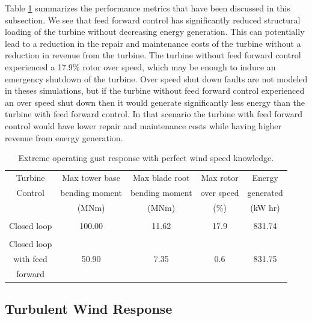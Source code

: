 Table \ref{Table3-1} summarizes the performance metrics that have been discussed in this subsection. We see that feed forward control has significantly reduced structural loading of the turbine without decreasing energy generation. This can potentially lead to a reduction in the repair and maintenance costs of the turbine without a reduction in revenue from the turbine. The turbine without feed forward control experienced a 17.9$\%$ rotor over speed, which may be enough to induce an emergency shutdown of the turbine. Over speed shut down faults are not modeled in theses simulations, but if the turbine without feed forward control experienced an over speed shut down then it would generate significantly less energy than the turbine with feed forward control. In that scenario the turbine with feed forward control would have lower repair and maintenance costs while having higher revenue from energy generation.

\begin{table}
\centering
\begin{tabular}{ c | c c c c }
\hline
\hline
Turbine			& Max tower	base		& Max blade	root		& Max rotor				& Energy\\
Control			& bending moment		& bending moment		& over speed					& generated\\
					& (MNm)  				& (MNm)				& ($\%$)	& (kW hr)\\
\hline
  &  &   &  &  \\
Closed loop  & 100.00 & 11.62  &17.9 & 831.74 \\
 &  &   &  & \\
Closed loop  &  &   &  &  \\
with feed  & 50.90 & 7.35  & 0.6 & 831.75 \\
forward  &  &   &  &  \\
\hline
\hline
\end{tabular}
\caption{Extreme operating gust response with perfect wind speed knowledge.}
\label{Table3-1}
\end{table}

\subsection{Turbulent Wind Response} \label{section3-4-2}

